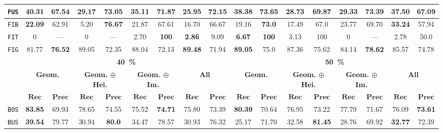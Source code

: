\begin{sidewaystable}[htbp]
\begin{center}
\begin{tabular}{|c | c c | c c | c c | c c || c c | c c | c c | c c |}
                    \hline
                    \texttt{FUS} & \textbf{40.31} & 67.54 & 29.17 & \textbf{73.05} & 35.11 & 71.87 & 25.95 & 72.15 & \textbf{38.38} & \textbf{73.65} & 28.73 & 69.87 & 29.33 & 73.39 & 37.50 & 67.09 \\
                    \hline
                    \texttt{FIB} & \textbf{22.09} & 62.91 & 5.20 & \textbf{76.67} & 21.87 & 67.61 & 16.70 & 66.67 & 19.16 & \textbf{73.0} & 17.49 & 67.0 & 23.77 & 69.70 & \textbf{33.24} & 57.94 \\
                    \hline
                    \texttt{FIT} & 0 & --- & 0 & --- & 2.70 & \textbf{100} & \textbf{2.86} & 9.09 & \textbf{6.67} & \textbf{100} & 3.13 & 100 & 0 & --- & 2.78 & 50.0 \\
                    \hline
                    \texttt{FIG} & 81.77 & \textbf{76.52} & 89.05 & 72.35 & 88.04 & 72.13 & \textbf{89.48} & 71.94 & \textbf{89.05} & 75.0 & 87.36 & 75.62 & 84.14 & \textbf{78.62} & 85.57 & 74.78 \\
                    \hline
                    \hline
                    & \multicolumn{8}{c||}{\textbf{\SI{40}{\percent}}} & \multicolumn{8}{c|}{\textbf{\SI{50}{\percent}}}\\
                    \hline
                    &\multicolumn{2}{c|}{\textbf{Geom.}} & \multicolumn{2}{c|}{\textbf{Geom. \(\oplus\) Hei.}} & \multicolumn{2}{c|}{\textbf{Geom. \(\oplus\) Im.}} & \multicolumn{2}{c||}{\textbf{All}} & \multicolumn{2}{c|}{\textbf{Geom.}} & \multicolumn{2}{c|}{\textbf{Geom. \(\oplus\) Hei.}} & \multicolumn{2}{c|}{\textbf{Geom. \(\oplus\) Im.}} & \multicolumn{2}{x{1.5cm}|}{\textbf{All}}\\
                    \cline{2-17}
                    & \(\bm{Rec}\) & \(\bm{Prec}\) &  \(\bm{Rec}\) & \(\bm{Prec}\) &  \(\bm{Rec}\) & \(\bm{Prec}\) &  \(\bm{Rec}\) & \(\bm{Prec}\) & \(\bm{Rec}\) & \(\bm{Prec}\) &  \(\bm{Rec}\) & \(\bm{Prec}\) &  \(\bm{Rec}\) & \(\bm{Prec}\) &  \(\bm{Rec}\) & \(\bm{Prec}\) \\
                    \hline
                    \texttt{BOS} & \textbf{83.85} & 69.93 & 78.65 & 74.55 & 75.52 & \textbf{74.71} & 75.80 & 73.39 & \textbf{80.39} & 70.64 & 76.95 & 73.22 & 77.79 & 71.67 & 76.09 & \textbf{73.61} \\
                    \hline
                    \texttt{BUS} & \textbf{39.54} & 79.77 & 30.94 & \textbf{80.0} & 34.47 & 78.57 & 30.93 & 76.32 & 25.17 & 71.70 & 32.58 & \textbf{81.45} & 28.76 & 69.92 & \textbf{32.77} & 72.39 \\
                    \hline

\end{tabular}
\end{center}
\end{sidewaystable}
